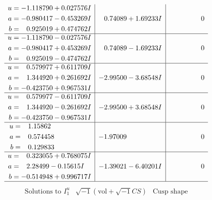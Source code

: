 \documentclass[1p]{elsarticle_modified}
\theoremstyle{definition}
\newcommand{\I}{\sqrt{-1}}
\begin{document}
$$\begin{array}{c|c|c}
\begin{aligned}
u &= -1.118790 + 0.027576 I \\
a &= -0.980417 - 0.453269 I \\
b &= \phantom{-}0.925019 + 0.474762 I\end{aligned}
 & \phantom{-}0.74089 + 1.69233 I & \phantom{-0.000000 } 0 \\ \hline\begin{aligned}
u &= -1.118790 - 0.027576 I \\
a &= -0.980417 + 0.453269 I \\
b &= \phantom{-}0.925019 - 0.474762 I\end{aligned}
 & \phantom{-}0.74089 - 1.69233 I & \phantom{-0.000000 } 0 \\ \hline\begin{aligned}
u &= \phantom{-}0.579977 + 0.611709 I \\
a &= \phantom{-}1.344920 + 0.261692 I \\
b &= -0.423750 + 0.967531 I\end{aligned}
 & -2.99500 - 3.68548 I & \phantom{-0.000000 } 0 \\ \hline\begin{aligned}
u &= \phantom{-}0.579977 - 0.611709 I \\
a &= \phantom{-}1.344920 - 0.261692 I \\
b &= -0.423750 - 0.967531 I\end{aligned}
 & -2.99500 + 3.68548 I & \phantom{-0.000000 } 0 \\ \hline\begin{aligned}
u &= \phantom{-}1.15862\phantom{ +0.000000I} \\
a &= \phantom{-}0.574458\phantom{ +0.000000I} \\
b &= \phantom{-}0.129833\phantom{ +0.000000I}\end{aligned}
 & -1.97009\phantom{ +0.000000I} & \phantom{-0.000000 } 0 \\ \hline\begin{aligned}
u &= \phantom{-}0.323055 + 0.768075 I \\
a &= \phantom{-}2.28499 - 0.15615 I \\
b &= -0.514948 + 0.996717 I\end{aligned}
 & -1.39021 - 6.40201 I & \phantom{-0.000000 } 0\\
 \hline 
 \end{array}$$\newpage$$\begin{array}{c|c|c}  
\text{Solutions to }I^u_{1}& \I (\text{vol} + \sqrt{-1}CS) & \text{Cusp shape}\\

\end{array}$$
\end{document}
